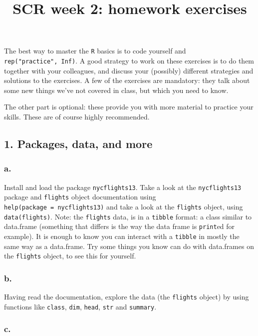 \documentclass[]{article}
\title{SCR week 2: homework exercises}
\author{}
\date{}
\begin{document}
\maketitle

The best way to master the \texttt{R} basics is to code yourself and
\texttt{rep("practice",\ Inf)}. A good strategy to work on these
exercises is to do them together with your colleagues, and discuss your
(possibly) different strategies and solutions to the exercises. A few of
the exercises are mandatory: they talk about some new things we've not
covered in class, but which you need to know.

The other part is optional: these provide you with more material to
practice your skills. These are of course highly recommended.

\hypertarget{packages-data-and-more}{%
\subsection{1. Packages, data, and more}\label{packages-data-and-more}}

\hypertarget{a.}{%
\subsubsection{a.}\label{a.}}

Install and load the package \texttt{nycflights13}. Take a look at the
\texttt{nycflights13} package and \texttt{flights} object documentation
using
\texttt{help(package\ =\ \textquotesingle{}nycflights13\textquotesingle{})}
and take a look at the \texttt{flights} object, using
\texttt{data(flights)}. Note: the \texttt{flights} data, is in a
\texttt{tibble} format: a class similar to data.frame (something that
differs is the way the data frame is \texttt{print}ed for example). It
is enough to know you can interact with a \texttt{tibble} in mostly the
same way as a data.frame. Try some things you know can do with
data.frames on the \texttt{flights} object, to see this for yourself.

\hypertarget{b.}{%
\subsubsection{b.}\label{b.}}

Having read the documentation, explore the data (the \texttt{flights}
object) by using functions like \texttt{class}, \texttt{dim},
\texttt{head}, \texttt{str} and \texttt{summary}.

\hypertarget{c.}{%
\subsubsection{c.}\label{c.}}
\end{document}
